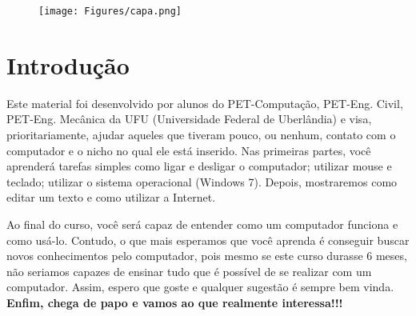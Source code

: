 \documentclass[hidelinks,12pt]{article}
\newcommand{\bigicon}[1]{\texttt{[image: \#1]}}
\newcommand{\iconb}[1]{\texttt{[image: \#1]}}
\begin{document}
\pagestyle{fancy}


\lhead{\bigicon{Figures/ufu}}
\rhead{\bigicon{Figures/facom}}
\lfoot{}
\cfoot{}
\rfoot{}
\vspace*{1cm}
\begin{figure}[!h]
	\centering
	\texttt{[image: Figures/capa.png]}
\end{figure}


\newpage
\fancyhead[C]{}
\fancyhead[R]{\iconb{Figures/comppet}}
\fancyhead[L]{\leftmark}
\fancyfoot{}
\fancyfoot[C]{\hspace{3.0cm}\thepage}


\tableofcontents
\listoffigures

{\let\thefootnote\relax{}}

{\let\thefootnote\relax{}}

{\let\thefootnote\relax{}}

\newpage

\section{Introdução}

 Este material foi desenvolvido por alunos do PET-Computação, PET-Eng. Civil, PET-Eng. Mecânica da UFU (Universidade Federal de Uberlândia) e visa, prioritariamente, ajudar aqueles que tiveram pouco, ou nenhum, contato com o computador e o nicho no qual ele está inserido. Nas primeiras partes, você aprenderá tarefas simples como ligar e desligar o computador; utilizar mouse e teclado; utilizar o sistema operacional (Windows 7). Depois, mostraremos como editar um texto e como utilizar a Internet.
 
 Ao final do curso, você será capaz de entender como um computador funciona e como usá-lo. Contudo, o que mais esperamos que você aprenda é conseguir buscar novos conhecimentos pelo computador, pois mesmo se este curso durasse 6 meses, não seriamos capazes de ensinar tudo que é possível de se realizar com um computador. Assim, espero que goste e qualquer sugestão é sempre bem vinda. \textbf{Enfim, chega de papo e vamos ao que realmente interessa!!!}
\end{document}
